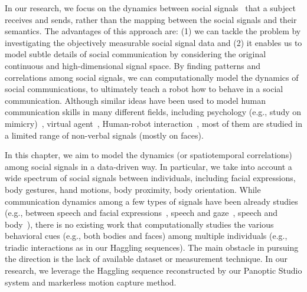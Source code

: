 In our research, we focus on the dynamics between social signals~\cite{pentland2004social} that a subject receives and sends, rather than the mapping between the social signals and their semantics. The advantages of this approach are: (1) we can tackle the problem by investigating the objectively measurable social signal data and (2) it enables us to model subtle details of social communication by considering the original continuous and high-dimensional signal space. By finding patterns and correlations among social signals, we can computationally model the dynamics of social communications, to ultimately teach a robot how to behave in a social communication. Although similar ideas have been used to model human communication skills in many different fields, including psychology (e.g., study on mimicry)~\cite{bernieri1988synchrony}, virtual agent~\cite{morency2008predicting,morency2010modeling}, Human-robot interaction~\cite{huang2014learning}, most of them are studied in a limited range of non-verbal signals (mostly on faces). %


In this chapter, we aim to model the dynamics (or spatiotemporal correlations) among social signals in a data-driven way. In particular, we take into account a wide spectrum of social signals between individuals, including facial expressions, body gestures, hand motions, body proximity, body orientation. While communication dynamics among a few types of signals have been already studies (e.g., between speech and facial expressions~\cite{kendon1980gesticulation, mcneill1992hand}, speech and gaze~\cite{griffin2001gaze}, speech and body~\cite{levine2010gesture}), there is no existing work that computationally studies the various behavioral cues (e.g., both bodies and faces) among multiple individuals (e.g., triadic interactions as in our Haggling sequences). The main obstacle in pursuing the direction is the lack of available dataset or measurement technique. In our research, we leverage the Haggling sequence reconstructed by our Panoptic Studio system and markerless motion capture method. %

